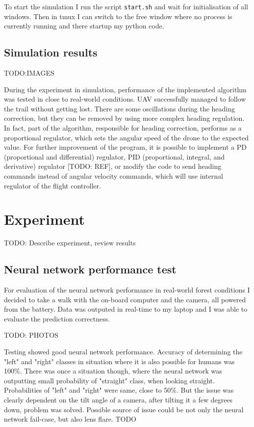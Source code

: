 To start the simulation I run the script \texttt{start.sh} and wait for initialisation of all windows. Then in tmux I can switch to the free window where no process is currently running and there startup my python code. 

\section{Simulation results}

TODO:IMAGES

During the experiment in simulation, performance of the implemented algorithm was tested in close to real-world conditions. UAV successfully managed to follow the trail without getting lost. There are some oscillations during the heading correction, but they can be removed by using more complex heading regulation. In fact, part of the algorithm, responsible for heading correction, performs as a proportional regulator, which sets the angular speed of the drone to the expected value. For further improvement of the program, it is possible to implement a PD (proportional and differential) regulator, PID (proportional, integral, and derivative) regulator [TODO: REF], or modify the code to send heading commands instead of angular velocity commands, which will use internal regulator of the flight controller.









\chapter{Experiment}

TODO: Describe experiment, review results

\section{Neural network performance test}

For evaluation of the neural network performance in real-world forest conditions I decided to take a walk with the on-board computer and the camera, all powered from  the battery. Data was outputed in real-time to my laptop and I was able to evaluate the prediction correctness. 

TODO: PHOTOS

Testing showed good neural network performance. Accuracy of determining the "left" and "right" classes in situation where it is also possible for humans was 100\%. There was once a situation though, where the neural network was outputting small probability of "straight" class, when looking straight. Probabilities of "left" and "right" were same, close to 50\%. But the issue was clearly dependent on the tilt angle of a camera, after tilting it a few degrees down, problem was solved. Possible source of issue could be not only the neural network fail-case, but also lens flare. TODO

